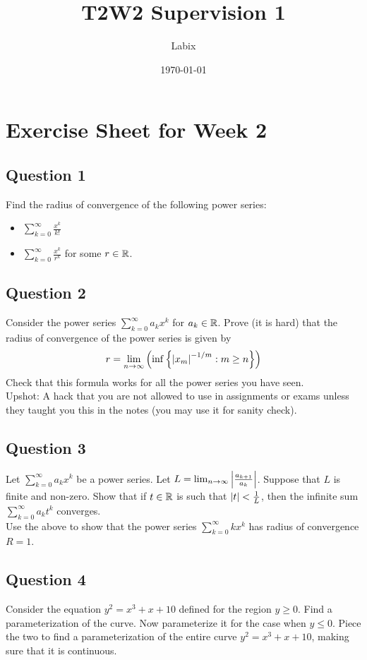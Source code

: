 \documentclass[a4paper]{article}
\title{T2W2 Supervision 1}
\author{Labix}
\date{\today}
\begin{document}
\section*{Exercise Sheet for Week 2}
\subsection*{Question 1}
Find the radius of convergence of the following power series: 
\begin{itemize}
\item $\sum_{k=0}^\infty\frac{x^k}{k!}$
\item $\sum_{k=0}^\infty\frac{x^k}{r^k}$ for some $r\in\mathbb{R}$. 
\end{itemize}

\subsection*{Question 2}
Consider the power series $\sum_{k=0}^\infty a_kx^k$ for $a_k\in\mathbb{R}$. Prove (it is hard) that the radius of convergence of the power series is given by $$r=\lim_{n\to\infty}\left(\inf\left\{\abs{x_m}^{-1/m}:m\geq n\right\}\right)$$ Check that this formula works for all the power series you have seen. \\

Upshot: A hack that you are not allowed to use in assignments or exams unless they taught you this in the notes (you may use it for sanity check). 

\subsection*{Question 3}
Let $\sum_{k=0}^\infty a_kx^k$ be a power series. Let $L=\lim_{n\to\infty}\abs{\frac{a_{k+1}}{a_k}}$. Suppose that $L$ is finite and non-zero. Show that if $t\in\mathbb{R}$ is such that $\abs{t}<\frac{1}{L}$, then the infinite sum $\sum_{k=0}^\infty a_kt^k$ converges. \\

Use the above to show that the power series $\sum_{k=0}^\infty kx^k$ has radius of convergence $R=1$. 

\subsection*{Question 4}
Consider the equation $y^2=x^3+x+10$ defined for the region $y\geq 0$. Find a parameterization of the curve. Now parameterize it for the case when $y\leq 0$. Piece the two to find a parameterization of the entire curve $y^2=x^3+x+10$, making sure that it is continuous. \\
\end{document}
